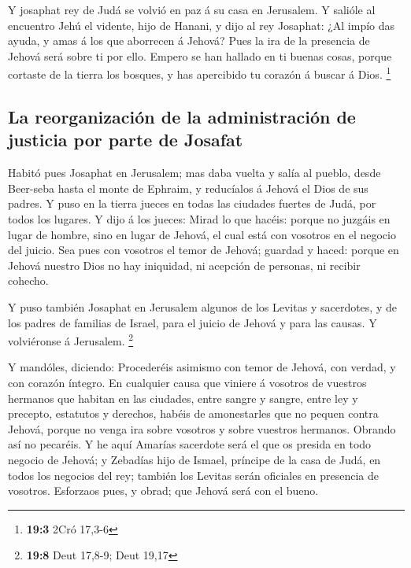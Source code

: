  Y josaphat rey de Judá se volvió en paz á su casa en
Jerusalem.  Y salióle al encuentro Jehú el vidente, hijo de
Hanani, y dijo al rey Josaphat: ¿Al impío das ayuda, y amas á los que
aborrecen á Jehová? Pues la ira de la presencia de Jehová será sobre ti
por ello.  Empero se han hallado en ti buenas cosas, porque
cortaste de la tierra los bosques, y has apercibido tu corazón á buscar
á Dios. \footnote{\textbf{19:3} 2Cró 17,3-6}

\hypertarget{la-reorganizaciuxf3n-de-la-administraciuxf3n-de-justicia-por-parte-de-josafat}{%
\subsection{La reorganización de la administración de justicia por parte
de
Josafat}\label{la-reorganizaciuxf3n-de-la-administraciuxf3n-de-justicia-por-parte-de-josafat}}

 Habitó pues Josaphat en Jerusalem; mas daba vuelta y salía
al pueblo, desde Beer-seba hasta el monte de Ephraim, y reducíalos á
Jehová el Dios de sus padres.  Y puso en la tierra jueces en
todas las ciudades fuertes de Judá, por todos los lugares. 
Y dijo á los jueces: Mirad lo que hacéis: porque no juzgáis en lugar de
hombre, sino en lugar de Jehová, el cual está con vosotros en el negocio
del juicio.  Sea pues con vosotros el temor de Jehová;
guardad y haced: porque en Jehová nuestro Dios no hay iniquidad, ni
acepción de personas, ni recibir cohecho.

 Y puso también Josaphat en Jerusalem algunos de los Levitas
y sacerdotes, y de los padres de familias de Israel, para el juicio de
Jehová y para las causas. Y volviéronse á Jerusalem. \footnote{\textbf{19:8}
  Deut 17,8-9; Deut 19,17}

 Y mandóles, diciendo: Procederéis asimismo con temor de
Jehová, con verdad, y con corazón íntegro.  En cualquier
causa que viniere á vosotros de vuestros hermanos que habitan en las
ciudades, entre sangre y sangre, entre ley y precepto, estatutos y
derechos, habéis de amonestarles que no pequen contra Jehová, porque no
venga ira sobre vosotros y sobre vuestros hermanos. Obrando así no
pecaréis.  Y he aquí Amarías sacerdote será el que os
presida en todo negocio de Jehová; y Zebadías hijo de Ismael, príncipe
de la casa de Judá, en todos los negocios del rey; también los Levitas
serán oficiales en presencia de vosotros. Esforzaos pues, y obrad; que
Jehová será con el bueno.

